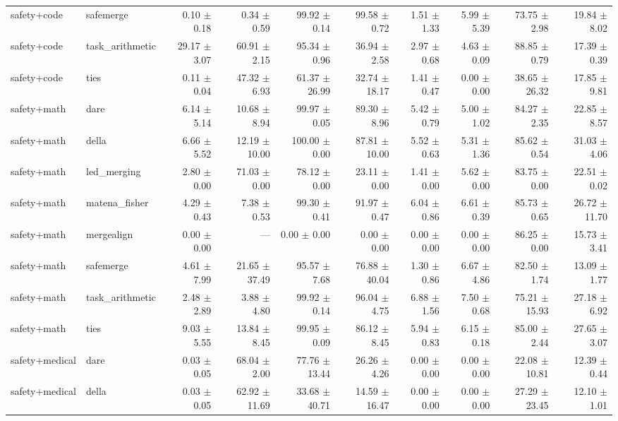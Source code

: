 \documentclass{article}
\begin{document}
\begin{table}[H]
{\begin{tabular}{llrrrrrrrr}
safety+code & safemerge & 0.10 $\pm$ 0.18 & 0.34 $\pm$ 0.59 & 99.92 $\pm$ 0.14 & 99.58 $\pm$ 0.72 & 1.51 $\pm$ 1.33 & 5.99 $\pm$ 5.39 & 73.75 $\pm$ 2.98 & 19.84 $\pm$ 8.02 \\
safety+code & task\_arithmetic & 29.17 $\pm$ 3.07 & 60.91 $\pm$ 2.15 & 95.34 $\pm$ 0.96 & 36.94 $\pm$ 2.58 & 2.97 $\pm$ 0.68 & 4.63 $\pm$ 0.09 & 88.85 $\pm$ 0.79 & 17.39 $\pm$ 0.39 \\
safety+code & ties & 0.11 $\pm$ 0.04 & 47.32 $\pm$ 6.93 & 61.37 $\pm$ 26.99 & 32.74 $\pm$ 18.17 & 1.41 $\pm$ 0.47 & 0.00 $\pm$ 0.00 & 38.65 $\pm$ 26.32 & 17.85 $\pm$ 9.81 \\
safety+math & dare & 6.14 $\pm$ 5.14 & 10.68 $\pm$ 8.94 & 99.97 $\pm$ 0.05 & 89.30 $\pm$ 8.96 & 5.42 $\pm$ 0.79 & 5.00 $\pm$ 1.02 & 84.27 $\pm$ 2.35 & 22.85 $\pm$ 8.57 \\
safety+math & della & 6.66 $\pm$ 5.52 & 12.19 $\pm$ 10.00 & 100.00 $\pm$ 0.00 & 87.81 $\pm$ 10.00 & 5.52 $\pm$ 0.63 & 5.31 $\pm$ 1.36 & 85.62 $\pm$ 0.54 & 31.03 $\pm$ 4.06 \\
safety+math & led\_merging & 2.80 $\pm$ 0.00 & 71.03 $\pm$ 0.00 & 78.12 $\pm$ 0.00 & 23.11 $\pm$ 0.00 & 1.41 $\pm$ 0.00 & 5.62 $\pm$ 0.00 & 83.75 $\pm$ 0.00 & 22.51 $\pm$ 0.02 \\
safety+math & matena\_fisher & 4.29 $\pm$ 0.43 & 7.38 $\pm$ 0.53 & 99.30 $\pm$ 0.41 & 91.97 $\pm$ 0.47 & 6.04 $\pm$ 0.86 & 6.61 $\pm$ 0.39 & 85.73 $\pm$ 0.65 & 26.72 $\pm$ 11.70 \\
safety+math & mergealign & 0.00 $\pm$ 0.00 & --- & 0.00 $\pm$ 0.00 & 0.00 $\pm$ 0.00 & 0.00 $\pm$ 0.00 & 0.00 $\pm$ 0.00 & 86.25 $\pm$ 0.00 & 15.73 $\pm$ 3.41 \\
safety+math & safemerge & 4.61 $\pm$ 7.99 & 21.65 $\pm$ 37.49 & 95.57 $\pm$ 7.68 & 76.88 $\pm$ 40.04 & 1.30 $\pm$ 0.86 & 6.67 $\pm$ 4.86 & 82.50 $\pm$ 1.74 & 13.09 $\pm$ 1.77 \\
safety+math & task\_arithmetic & 2.48 $\pm$ 2.89 & 3.88 $\pm$ 4.80 & 99.92 $\pm$ 0.14 & 96.04 $\pm$ 4.75 & 6.88 $\pm$ 1.56 & 7.50 $\pm$ 0.68 & 75.21 $\pm$ 15.93 & 27.18 $\pm$ 6.92 \\
safety+math & ties & 9.03 $\pm$ 5.55 & 13.84 $\pm$ 8.45 & 99.95 $\pm$ 0.09 & 86.12 $\pm$ 8.45 & 5.94 $\pm$ 0.83 & 6.15 $\pm$ 0.18 & 85.00 $\pm$ 2.44 & 27.65 $\pm$ 3.07 \\
safety+medical & dare & 0.03 $\pm$ 0.05 & 68.04 $\pm$ 2.00 & 77.76 $\pm$ 13.44 & 26.26 $\pm$ 4.26 & 0.00 $\pm$ 0.00 & 0.00 $\pm$ 0.00 & 22.08 $\pm$ 10.81 & 12.39 $\pm$ 0.44 \\
safety+medical & della & 0.03 $\pm$ 0.05 & 62.92 $\pm$ 11.69 & 33.68 $\pm$ 40.71 & 14.59 $\pm$ 16.47 & 0.00 $\pm$ 0.00 & 0.00 $\pm$ 0.00 & 27.29 $\pm$ 23.45 & 12.10 $\pm$ 1.01 \\

\end{tabular}}
\end{table}
\end{document}
